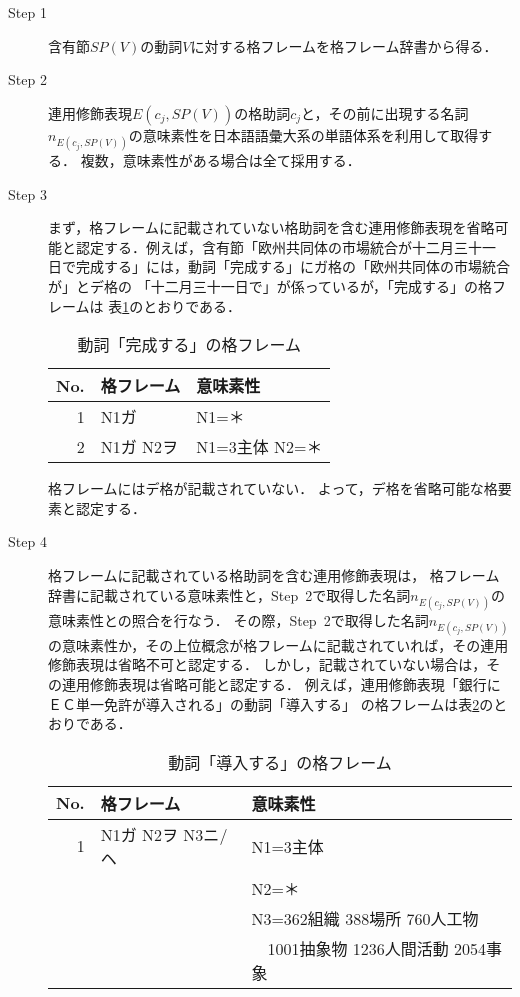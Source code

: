 \begin{description}
  \item[Step 1] 含有節$SP(V)$の動詞$V$に対する格フレームを格フレーム辞書から得る．
  \item[Step 2] 連用修飾表現$E(c_{j},SP(V))$の格助詞$c_{j}$と，その前に出現する名詞$n_{E(c_{j},SP(V))}$の意味素性を日本語語彙大系\cite{goi}の単語体系を利用して取得する．
複数，意味素性がある場合は全て採用する．
  \item[Step 3] まず，格フレームに記載されていない格助詞を含む連用修飾表現を省略可能と認定する．例えば，含有節「欧州共同体の市場統合が十二月三十一
日で完成する」には，動詞「完成する」にガ格の「欧州共同体の市場統合が」とデ格の
「十二月三十一日で」が係っているが，「完成する」の格フレームは
表\ref{KANSEI}のとおりである．
\begin{table}[bt]
\begin{center}
\caption{動詞「完成する」の格フレーム} \label{KANSEI}
\begin{tabular}{r|l|l}
\hline
No. & 格フレーム & 意味素性\\ \hline \hline
1 & N1ガ & N1=＊ \\
2 & N1ガ N2ヲ & N1=3主体 N2=＊ \\
\hline
\end{tabular}
\end{center}
\end{table}
格フレームにはデ格が記載されていない．
よって，デ格を省略可能な格要素と認定する．
  \item[Step 4] 格フレームに記載されている格助詞を含む連用修飾表現は，
格フレーム辞書に記載されている意味素性と，Step\ 2で取得した名詞$n_{E(c_{j},SP(V))}$の意味素性との照合を行なう．
その際，Step\ 2で取得した名詞$n_{E(c_{j},SP(V))}$の意味素性か，その上位概念が格フレームに記載されていれば，その連用修飾表現は省略不可と認定する．
しかし，記載されていない場合は，その連用修飾表現は省略可能と認定する．
例えば，連用修飾表現「銀行にＥＣ単一免許が導入される」の動詞「導入する」
の格フレームは表\ref{Include}のとおりである．
\begin{table}[bt]
\begin{center}
\caption{動詞「導入する」の格フレーム} \label{Include}
\begin{tabular}{r|l|l}
\hline
No. & 格フレーム & 意味素性\\ \hline \hline
1 & N1ガ N2ヲ N3ニ/ヘ & N1=3主体\\ 
  & & N2=＊\\
  & & N3=362組織 388場所 760人工物\\
  & &　1001抽象物 1236人間活動 2054事象 \\

\end{tabular}
\end{center}
\end{table}
\end{description}
